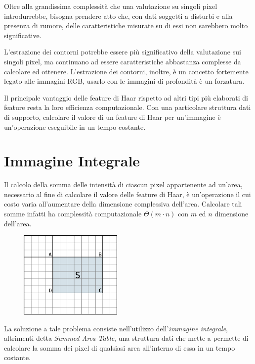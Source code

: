             Oltre alla grandissima complessità che una valutazione su singoli pixel introdurrebbe, bisogna prendere atto che, con dati soggetti a disturbi e alla presenza di rumore, delle caratteristiche misurate su di essi non sarebbero molto significative.

            L'estrazione dei contorni potrebbe essere più significativo della valutazione sui singoli pixel, ma continuano ad essere caratteristiche abbastanza complesse da calcolare ed ottenere.
            L'estrazione dei contorni, inoltre, è un concetto fortemente legato alle immagini RGB, usarlo con le immagini di profondità è un forzatura.

            Il principale vantaggio delle feature di Haar rispetto ad altri tipi più elaborati di feature resta la loro efficienza computazionale.
            Con una particolare struttura dati di supporto, calcolare il valore di un feature di Haar per un'immagine è un'operazione eseguibile in un tempo costante.
            
    \section{Immagine Integrale}
    \label{sec:integral_image}
        Il calcolo della somma delle intensità di ciascun pixel appartenente ad un'area, necessario al fine di calcolare il valore delle feature di Haar, è un'operazione il cui costo varia all'aumentare della dimensione complessiva dell'area.
        Calcolare tali somme infatti ha complessità computazionale $\Theta(m \cdot n)$ con $m$ ed $n$ dimensione dell'area.

        \begin{figure}
            \centering
            \includegraphics[width=5cm]{img/integral_image_sum.png}
            \caption{}
            \label{fig:integral_image_sum}
        \end{figure}

        La soluzione a tale problema consiste nell'utilizzo dell'\emph{immagine integrale}, altrimenti detta \emph{Summed Area Table}, una struttura dati che mette a permette di calcolare la somma dei pixel di qualsiasi area all'interno di essa in un tempo costante.

